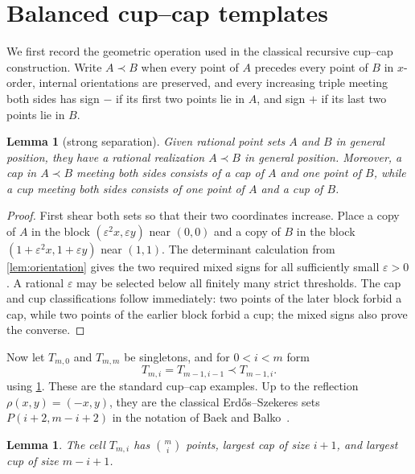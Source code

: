 \documentclass[11pt]{article}
\newtheorem{lemma}[theorem]{Lemma}
\theoremstyle{remark}
\begin{document}
\section{Balanced cup--cap templates}

We first record the geometric operation used in the classical recursive
cup--cap construction.  Write $A\prec B$ when every point of $A$ precedes
every point of $B$ in $x$-order, internal orientations are preserved, and
every increasing triple meeting both sides has sign $-$ if its first two
points lie in $A$, and sign $+$ if its last two points lie in $B$.

\begin{lemma}[strong separation]\label{lem:strong-glue}
Given rational point sets $A$ and $B$ in general position, they have a
rational realization $A\prec B$ in general position.  Moreover, a cap in
$A\prec B$ meeting both sides consists of a cap of $A$ and one point of
$B$, while a cup meeting both sides consists of one point of $A$ and a cup
of $B$.
\end{lemma}

\begin{proof}
First shear both sets so that their two coordinates increase.  Place a
copy of $A$ in the block
$(\varepsilon^2x,\varepsilon y)$ near $(0,0)$ and a copy of $B$ in the
block $(1+\varepsilon^2x,1+\varepsilon y)$ near $(1,1)$.  The determinant
calculation from \cref{lem:orientation} gives the two required mixed signs
for all sufficiently small $\varepsilon>0$.  A rational $\varepsilon$ may
be selected below all finitely many strict thresholds.  The cap and cup
classifications follow immediately: two points of the later block forbid a
cap, while two points of the earlier block forbid a cup; the mixed signs
also prove the converse.
\end{proof}

Now let $T_{m,0}$ and $T_{m,m}$ be singletons, and for $0<i<m$ form
\[
 T_{m,i}=T_{m-1,i-1}\prec T_{m-1,i}.             \tag{4.1}\label{eq:pascal-glue}
\]
using \cref{lem:strong-glue}.  These are the standard cup--cap examples.
Up to the reflection $\rho(x,y)=(-x,y)$, they are the classical
Erd\H{o}s--Szekeres sets $P(i+2,m-i+2)$ in the notation of Baek and
Balko~\cite[Section~4]{BaekBalko2026}.

\begin{lemma}\label{lem:pascal}
The cell $T_{m,i}$ has $\binom mi$ points, largest cap of size $i+1$, and
largest cup of size $m-i+1$.
\end{lemma}
\end{document}
